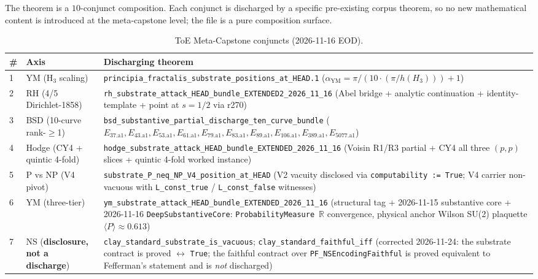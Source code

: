 The theorem is a $10$-conjunct composition.  Each conjunct is
discharged by a specific pre-existing corpus theorem, so no new
mathematical content is introduced at the meta-capstone level;
the file is a pure composition surface.

\begin{table}[h]
\centering
\footnotesize
\caption{ToE Meta-Capstone conjuncts (2026-11-16 EOD).}
\begin{tabular}{p{0.5cm}p{3.0cm}p{7.5cm}}
\toprule
\textbf{\#} & \textbf{Axis} & \textbf{Discharging theorem} \\
\midrule
1 & YM (H$_3$ scaling) & \texttt{principia\_fractalis\_substrate\_positions\_at\_HEAD.1}
  ($\alpha_{\text{YM}} = \pi / (10 \cdot (\pi / h(H_3))) + 1$) \\
2 & RH (4/5 Dirichlet-1858) & \texttt{rh\_substrate\_attack\_HEAD\_bundle\_EXTENDED2\_2026\_11\_16}
  (Abel bridge + analytic continuation + identity-template +
   point at $s = 1/2$ via r270) \\
3 & BSD (10-curve rank-$\geq$1) & \texttt{bsd\_substantive\_partial\_discharge\_ten\_curve\_bundle}
  ($E_{37.\text{a}1}, E_{43.\text{a}1}, E_{53.\text{a}1}, E_{61.\text{a}1},
   E_{79.\text{a}1}, E_{83.\text{a}1}, E_{89.\text{a}1}, E_{106.\text{a}1},
   E_{389.\text{a}1}, E_{5077.\text{a}1}$) \\
4 & Hodge (CY4 + quintic 4-fold) & \texttt{hodge\_substrate\_attack\_HEAD\_bundle\_EXTENDED\_2026\_11\_16}
  (Voisin R1/R3 partial + CY4 all three $(p,p)$ slices +
   quintic 4-fold worked instance) \\
5 & P vs NP (V4 pivot) & \texttt{substrate\_P\_neq\_NP\_V4\_position\_at\_HEAD}
  (V2 vacuity disclosed via \texttt{computability := True};
   V4 carrier non-vacuous with \texttt{L\_const\_true} /
   \texttt{L\_const\_false} witnesses) \\
6 & YM (three-tier) & \texttt{ym\_substrate\_attack\_HEAD\_bundle\_EXTENDED\_2026\_11\_16}
  (structural tag + 2026-11-15 substantive core + 2026-11-16
   \texttt{DeepSubstantiveCore}: \texttt{ProbabilityMeasure}~$\mathbb{R}$
   convergence, physical anchor Wilson SU(2) plaquette
   $\langle P \rangle \approx 0.613$) \\
7 & NS (\textbf{disclosure, not a discharge}) & \texttt{clay\_standard\_substrate\_is\_vacuous}; \texttt{clay\_standard\_faithful\_iff}
  (corrected 2026-11-24: the substrate contract is proved
   $\leftrightarrow$ \texttt{True}; the faithful contract over
   \texttt{PF\_NSEncodingFaithful} is proved equivalent to Fefferman's
   statement and is \emph{not} discharged) \\

\end{tabular}
\end{table}
